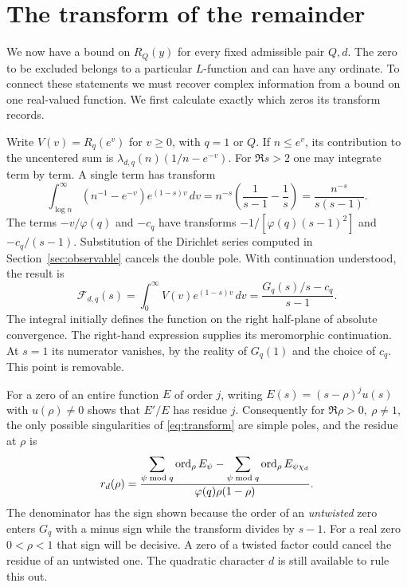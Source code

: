 \section{The transform of the remainder}\label{sec:transform}
We now have a bound on \(R_Q(y)\) for every fixed admissible pair \(Q,d\). The zero to be excluded belongs to a particular \(L\)-function and can have any ordinate. To connect these statements we must recover complex information from a bound on one real-valued function. We first calculate exactly which zeros its transform records.

Write \(V(v)=R_q(e^v)\) for \(v\ge0\), with \(q=1\) or \(Q\). If \(n\le e^v\), its contribution to the uncentered sum is \(\lambda_{d,q}(n)(1/n-e^{-v})\). For \(\Re s>2\) one may integrate term by term. A single term has transform
\[
 \int_{\log n}^{\infty}(n^{-1}-e^{-v})e^{(1-s)v}\,dv
 =n^{-s}\left(\frac1{s-1}-\frac1s\right)
 =\frac{n^{-s}}{s(s-1)}.
\]
The terms \(-v/\varphi(q)\) and \(-c_q\) have transforms \(-1/[\varphi(q)(s-1)^2]\) and \(-c_q/(s-1)\). Substitution of the Dirichlet series computed in Section~\ref{sec:observable} cancels the double pole. With continuation understood, the result is
\begin{equation}\label{eq:transform}
 \mathcal F_{d,q}(s)
   =\int_0^\infty V(v)e^{(1-s)v}\,dv
   =\frac{G_q(s)/s-c_q}{s-1}.
\end{equation}
The integral initially defines the function on the right half-plane of absolute convergence. The right-hand expression supplies its meromorphic continuation. At \(s=1\) its numerator vanishes, by the reality of \(G_q(1)\) and the choice of \(c_q\). This point is removable.

For a zero of an entire function \(E\) of order \(j\), writing \(E(s)=(s-\rho)^j u(s)\) with \(u(\rho)\ne0\) shows that \(E'/E\) has residue \(j\). Consequently for \(\Re\rho>0,\ \rho\ne1\), the only possible singularities of \eqref{eq:transform} are simple poles, and the residue at \(\rho\) is
\begin{equation}\label{eq:residues}
 r_d(\rho)=
 \frac{\displaystyle\sum_{\psi\bmod q}\operatorname{ord}_\rho E_\psi-
       \displaystyle\sum_{\psi\bmod q}\operatorname{ord}_\rho E_{\psi\chi_d}}
      {\varphi(q)\rho(1-\rho)}.
\end{equation}
The denominator has the sign shown because the order of an \emph{untwisted} zero enters \(G_q\) with a minus sign while the transform divides by \(s-1\). For a real zero \(0<\rho<1\) that sign will be decisive. A zero of a twisted factor could cancel the residue of an untwisted one. The quadratic character \(d\) is still available to rule this out.

